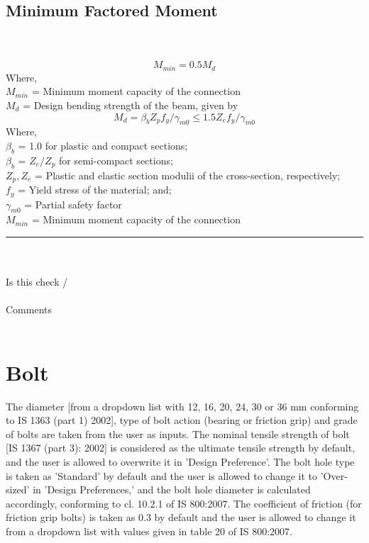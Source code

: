 \documentclass[11.5pt,a4paper,oneside]{report}
\newcommand{\okornot}{ \vspace{15mm} \hrule
	\noindent \\ \\
	Is this check \qquad
	\CheckBox[checked=False, name= ok]{\textbf{Ok}} \qquad / 
	\CheckBox[checked=False, name= notok]{\textbf{Not Ok}}\\ \\
	Comments \\ \\
	\noindent
	\TextField[name=multilinetextbox, multiline=true, width=1.0\linewidth,height=2in]{}}
\begin{document}
\begin{Form}
\section{Minimum Factored Moment} 
\qquad \qquad[Reference: Cl. 10.7, b-1, IS 800 : 2007] \\ \\
	\begin{equation}\label{eq:cl_10.7b, IS 800}
		M_{min} = 0.5 M_d 
	\end{equation}
	Where, \\
		\indent $M_{min}$ = Minimum moment capacity of the connection \\
		\indent $M_d$ = Design bending strength of the beam, given by
	\begin{equation} \label{eq:cl_8.2.1.2a, IS 800}
		M_d = \beta_b Z_p f_y / \gamma_{m0} \le 1.5 Z_e f_y / \gamma_{m0} 
	\end{equation}
	Where, \\
		\indent $\beta_b$ = 1.0 for plastic and compact sections;\\
		\indent $\beta_b$ = $Z_e/Z_p$ for semi-compact sections;\\
		\indent $Z_p, Z_e$ = Plastic and elastic section modulii of the cross-section, respectively; \\
		\indent $f_y$ = Yield stress of the material; and;\\
		\indent $\gamma_{m0}$ = Partial safety factor \\
		\indent $M_{min}$ = Minimum moment capacity of the connection

\okornot
\chapter{Bolt}
%
The diameter [from a dropdown list with 12, 16, 20, 24, 30 or 36 mm conforming to IS 1363 (part 1) 2002], type of bolt action (bearing or friction grip) and grade of bolts are taken from the user as inputs. The nominal tensile strength of bolt [IS 1367 (part 3): 2002] is considered as the ultimate tensile strength by default, and the user is allowed to overwrite it in 'Design Preference'. The bolt hole type is taken as 'Standard' by default and the user is allowed to change it to 'Over-sized' in 'Design Preferences,' and the bolt hole diameter is calculated accordingly, conforming to cl. 10.2.1 of IS 800:2007. The coefficient of friction (for friction grip bolts) is taken as 0.3 by default and the user is allowed to change it from a dropdown list with values given in table 20 of IS 800:2007. 

\end{Form}
\end{document}

